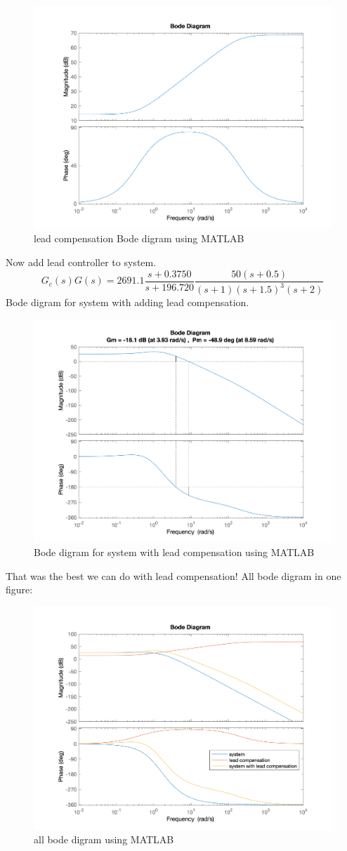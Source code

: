 \begin{figure}[H]
	\caption{lead compensation Bode digram using MATLAB}
	\centering
	\includegraphics[width=12cm]{../Figure/Q1/a/controller_bode.png}
\end{figure}
Now add lead controller to system.
$$
G_c(s)G(s) = 2691.1\dfrac{s + 0.3750}{s + 196.720} \dfrac{50(s+0.5)}{(s+1)(s+1.5)^{3}(s+2)}
$$
Bode digram for system with adding lead compensation.
\begin{figure}[H]
	\caption{Bode digram for system with lead compensation using MATLAB}
	\centering
	\includegraphics[width=12cm]{../Figure/Q1/a/new_margin.png}
\end{figure}
That was the best we can do with lead compensation!
All bode digram in one figure:
\begin{figure}[H]
	\caption{all bode digram using MATLAB}
	\centering
	\includegraphics[width=12cm]{../Figure/Q1/a/all_in_one.png}
\end{figure}